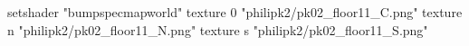 setshader "bumpspecmapworld"
    texture 0 "philipk2/pk02_floor11_C.png"
    texture n "philipk2/pk02_floor11_N.png"
    texture s "philipk2/pk02_floor11_S.png"